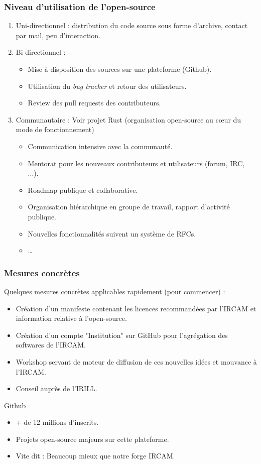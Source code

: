\documentclass[xcolor=dvipsnames]{beamer}
\begin{document}
\begin{frame}
\frametitle{Niveau d'utilisation de l'open-source}

\begin{enumerate}
\item Uni-directionnel : distribution du code source sous forme d'archive, contact par mail, peu d'interaction.
\item Bi-directionnel :
  \begin{itemize}
  \item Mise à disposition des sources sur une plateforme (Github).
  \item Utilisation du \textit{bug tracker} et retour des utilisateurs.
  \item Review des pull requests des contributeurs.
  \end{itemize}
\item Communautaire : Voir projet Rust (organisation open-source au cœur du mode de fonctionnement)
  \begin{itemize}
    \item Communication intensive avec la communauté.
    \item Mentorat pour les nouveaux contributeurs et utilisateurs (forum, IRC, ...).
    \item Roadmap publique et collaborative.
    \item Organisation hiérarchique en groupe de travail, rapport d'activité publique.
    \item Nouvelles fonctionnalités suivent un système de RFCs.
    \item \ldots
  \end{itemize}
\end{enumerate}
\end{frame}

\begin{frame}
\frametitle{Mesures concrètes}

Quelques mesures concrètes applicables rapidement (pour commencer) :

\begin{itemize}
\item Création d'un manifeste contenant les licences recommandées par l'IRCAM et information relative à l'open-source.
\item Création d'un compte "Institution" sur GitHub pour l’agrégation des softwares de l'IRCAM.
\item Workshop servant de moteur de diffusion de ces nouvelles idées et mouvance à l'IRCAM.
\item Conseil auprès de l'IRILL.
\end{itemize}

\begin{block}{Github}
\begin{itemize}
  \item + de 12 millions d'inscrits.
  \item Projets open-source majeurs sur cette plateforme.
  \item Vite dit : Beaucoup mieux que notre forge IRCAM.
\end{itemize}
\end{block}

\end{frame}
\end{document}
